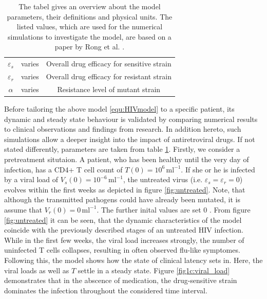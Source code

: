 \begin{table}
\begin{tabular}{ ccc }
        $\varepsilon_{s}$   & varies & Overall drug efficacy for sensitive strain\\
        $\varepsilon_{r}$   & varies & Overall drug efficacy for resistant strain\\
        $\alpha$   & varies & Resistance level of mutant strain\\
        \hline
        \hline
    \end{tabular}
    \caption{The tabel gives an overview about the model parameters, their definitions and physical units.
    The listed values, which are used for the numerical simulations to investigate the model, are based on a paper by Rong et al. \cite{rong2007emergence}.}
    \label{tab:init_parameters}
\end{table}

Before tailoring the above model \ref{equ:HIVmodel} to a specific patient, its dynamic and steady state behaviour is validated by comparing numerical results 
to clinical observations and findings from research.
In addition hereto, such simulations allow a deeper insight into the impact of antiretroviral drugs.
If not stated differently, parameters are taken from table \ref{tab:init_parameters}.\newline
Firstly, we consider a pretreatment situtaion.
A patient, who has been healthy until the very day of infection, has a CD4+ T cell count of $T(0) = 10^{6} \, \text{ml}^{-1}$.
If she or he is infected by a viral load of $V_s(0) = 10^{-6} \, \text{ml}^{-1}$, the untreated virus (i.e. $\varepsilon_s = \varepsilon_r = 0$) 
evolves within the first weeks as depicted in figure \ref{fig:untreated}.
Note, that although the transmitted pathogens could have already been mutated, it is assume that $V_r(0) = 0\, \text{ml}^{-1}$.
The further inital values are set $0$ \cite{perelson1993dynamics}.\newline
From figure \ref{fig:untreated} it can be seen, that the dynamic characteristics of the model coincide with the previously described stages
of an untreated HIV infection.
While in the first few weeks, the viral load increases strongly, the number of uninfected T cells collapses, resulting in often observed flu-like 
symptomes. 
Following this, the model shows how the state of clinical latency sets in.
Here, the viral loads as well as $T$ settle in a steady state.
Figure \ref{fig1c:viral_load} demonstrates that in the abscence of medication, the drug-sensitive strain dominates the infection throughout the 
considered time interval.

